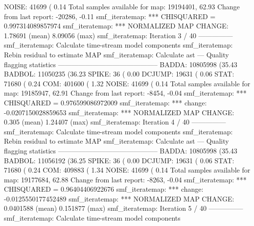 \begin{terminalv}
 NOISE:      41699 ( 0.14%
Total samples available for map:   19194401, 62.93%
     Change from last report:     -20286, -0.11%
smf_iteratemap: *** CHISQUARED = 0.997314089857974
smf_iteratemap: *** NORMALIZED MAP CHANGE: 1.78691 (mean) 8.09056 (max)
smf_iteratemap: Iteration 3 / 40 ---------------
smf_iteratemap: Calculate time-stream model components
smf_iteratemap: Rebin residual to estimate MAP
smf_iteratemap: Calculate ast
--- Quality flagging statistics --------------------------------------------
 BADDA:   10805998 (35.43%
BADBOL:   11050235 (36.23%
 SPIKE:         36 ( 0.00%
DCJUMP:      19631 ( 0.06%
  STAT:      71680 ( 0.24%
   COM:     401600 ( 1.32%
 NOISE:      41699 ( 0.14%
Total samples available for map:   19185947, 62.91%
     Change from last report:      -8454, -0.04%
smf_iteratemap: *** CHISQUARED = 0.976599086972009
smf_iteratemap: *** change: -0.0207150028859653
smf_iteratemap: *** NORMALIZED MAP CHANGE: 0.305 (mean) 1.24407 (max)
smf_iteratemap: Iteration 4 / 40 ---------------
smf_iteratemap: Calculate time-stream model components
smf_iteratemap: Rebin residual to estimate MAP
smf_iteratemap: Calculate ast
--- Quality flagging statistics --------------------------------------------
 BADDA:   10805998 (35.43%
BADBOL:   11056192 (36.25%
 SPIKE:         36 ( 0.00%
DCJUMP:      19631 ( 0.06%
  STAT:      71680 ( 0.24%
   COM:     409883 ( 1.34%
 NOISE:      41699 ( 0.14%
Total samples available for map:   19177684, 62.88%
     Change from last report:      -8263, -0.04%
smf_iteratemap: *** CHISQUARED = 0.96404406922676
smf_iteratemap: *** change: -0.0125550177452489
smf_iteratemap: *** NORMALIZED MAP CHANGE: 0.0401588 (mean) 0.151877 (max)
smf_iteratemap: Iteration 5 / 40 ---------------
smf_iteratemap: Calculate time-stream model components

\end{terminalv}
